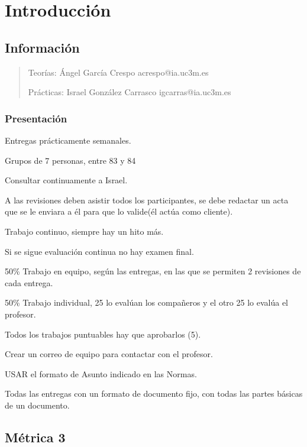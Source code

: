\documentclass[12pt, twoside, openright]{report} %
\begin{document}




\part{Introducción}

\chapter{Información}

\begin{quote}
Teorías: Ángel García Crespo acrespo@ia.uc3m.es

Prácticas: Israel González Carrasco igcarras@ia.uc3m.es
\end{quote}

\section{Presentación}

Entregas prácticamente semanales.

Grupos de 7 personas, entre 83 y 84

Consultar continuamente a Israel.

A las revisiones deben asistir todos los participantes, se debe redactar
un acta que se le enviara a él para que lo valide(él actúa como cliente).

Trabajo continuo, siempre hay un hito más.

Si se sigue evaluación continua no hay examen final.

50\% Trabajo en equipo, según las entregas, en las que se permiten 2
revisiones de cada entrega.

50\% Trabajo individual, 25 lo evalúan los compañeros y el otro 25 lo
evalúa el profesor.

Todos los trabajos puntuables hay que aprobarlos (5).

Crear un correo de equipo para contactar con el profesor.

USAR el formato de Asunto indicado en las Normas.

Todas las entregas con un formato de documento fijo, con todas las
partes básicas de un documento.

\chapter{Métrica 3}
\end{document}
